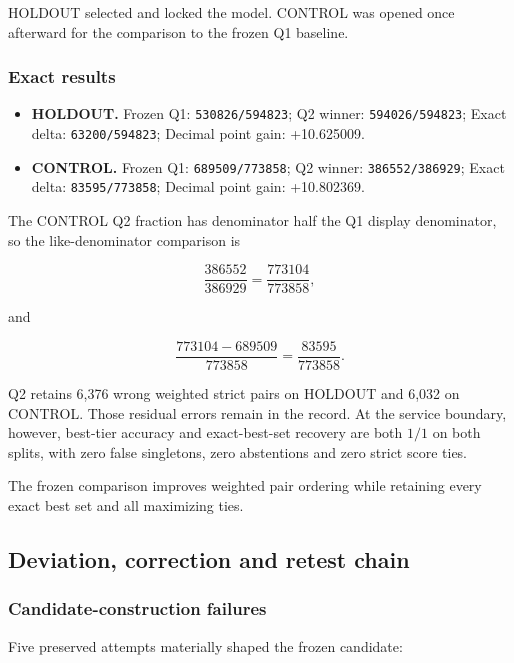 HOLDOUT selected and locked the model. CONTROL was opened once afterward
for the comparison to the frozen Q1 baseline.

\subsubsection{Exact results}\label{viii-ch07-exact-results}

\begin{itemize}
\tightlist
\item
  \textbf{HOLDOUT.} Frozen Q1: \texttt{530826/594823}; Q2 winner:
  \texttt{594026/594823}; Exact delta: \texttt{63200/594823}; Decimal
  point gain: +10.625009.
\item
  \textbf{CONTROL.} Frozen Q1: \texttt{689509/773858}; Q2 winner:
  \texttt{386552/386929}; Exact delta: \texttt{83595/773858}; Decimal
  point gain: +10.802369.
\end{itemize}

The CONTROL Q2 fraction has denominator half the Q1 display denominator,
so the like-denominator comparison is

\[
\frac{386552}{386929}
=\frac{773104}{773858},
\]

and

\[
\frac{773104-689509}{773858}
=\frac{83595}{773858}.
\]

Q2 retains 6,376 wrong weighted strict pairs on HOLDOUT and 6,032 on
CONTROL. Those residual errors remain in the record. At the service
boundary, however, best-tier accuracy and exact-best-set recovery are
both \(1/1\) on both splits, with zero false singletons, zero
abstentions and zero strict score ties.

The frozen comparison improves weighted pair ordering while retaining every exact best set and all maximizing ties.

\subsection{Deviation, correction and retest
chain}\label{viii-ch07-deviation-correction-and-retest-chain}

\subsubsection{Candidate-construction
failures}\label{viii-ch07-candidate-construction-failures}

Five preserved attempts materially shaped the frozen candidate:

